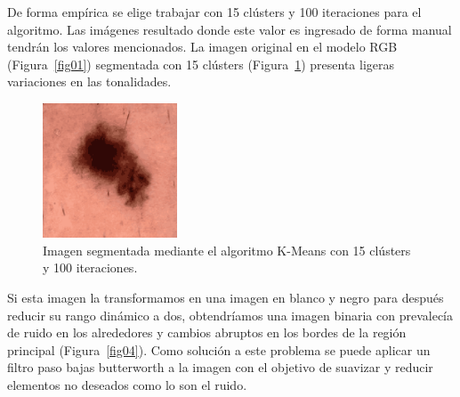 De forma empírica se elige trabajar con 15 clústers y 100 iteraciones para el algoritmo. Las imágenes resultado donde este valor es ingresado de forma manual tendrán los valores mencionados. La imagen original en el modelo RGB (Figura~\ref{fig01}) segmentada con 15 clústers (Figura~\ref{fig03}) presenta ligeras variaciones en las tonalidades.

\begin{figure}[h] 
	\begin{center} 
		\includegraphics[width=4cm]{images/F03-A.png} 
	\end{center} 
	\vspace{-10pt}
	\caption{\footnotesize Imagen segmentada mediante el algoritmo K-Means con 15 clústers y 100 iteraciones.}  
	\label{fig03} 
\end{figure}

Si esta imagen la transformamos en una imagen en blanco y negro para después reducir su rango dinámico a dos, obtendríamos una imagen binaria con prevalecía de ruido en los alrededores y cambios abruptos en los bordes de la región principal (Figura~\ref{fig04}). Como solución a este problema se puede aplicar un filtro paso bajas butterworth a la imagen con el objetivo de suavizar y reducir elementos no deseados como lo son el ruido.  

